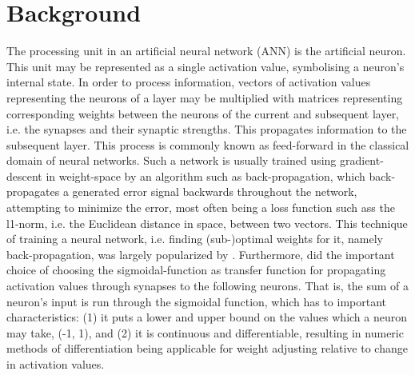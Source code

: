 
\chapter{Background}\label{chpt:background}

The processing unit in an artificial neural network (ANN) is the artificial neuron. This unit may be represented as a single activation value, symbolising a neuron's internal state. In order to process information, vectors of activation values representing the neurons of a layer may be multiplied with matrices representing corresponding weights between the neurons of the current and subsequent layer, i.e. the synapses and their synaptic strengths. This propagates information to the subsequent layer. This process is commonly known as feed-forward in the classical domain of neural networks. Such a network is usually trained using gradient-descent in weight-space by an algorithm such as back-propagation, which back-propagates a generated error signal backwards throughout the network, attempting to minimize the error, most often being a loss function such ass the l1-norm, i.e. the Euclidean distance in space, between two vectors. This technique of training a neural network, i.e. finding (sub-)optimal weights for it, namely back-propagation, was largely popularized by \cite{Rumelhart1986}. Furthermore, \cite{Rumelhart1986} did the important choice of choosing the sigmoidal-function as transfer function for propagating activation values through synapses to the following neurons. That is, the sum of a neuron's input is run through the sigmoidal function, which has to important characteristics: (1) it puts a lower and upper bound on the values which a neuron may take, (-1, 1), and (2) it is continuous and differentiable, resulting in numeric methods of differentiation being applicable for weight adjusting relative to change in activation values.

